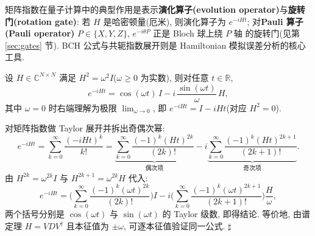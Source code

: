 \documentclass[utf8]{article} %
\numberwithin{equation}{section}   %
\newtheorem{Lem}{\hskip 2em {\color{magenta} 引理}}[subsection]
\newtheorem{Note}{\hskip 2em {\color{red} 注}}[subsection]
\newenvironment{Proof}{{\noindent\it Proof:}\quad}{\hfill $\sharp $\par}
\begin{document}
\begin{Note}
    矩阵指数在量子计算中的典型作用是表示\textbf{演化算子(evolution operator)}与\textbf{旋转门(rotation gate)}: 若 $H$ 是哈密顿量(厄米),
    则演化算子为 $e^{-iHt}$; 对\textbf{Pauli 算子(Pauli operator)} $P \in \{X, Y, Z\}$, $e^{-i\theta P}$ 正是 Bloch 球上绕 $P$ 轴
    的旋转门(见第 \ref{sec:gates} 节). BCH 公式与共轭指数展开则是 Hamiltonian 模拟误差分析的核心工具.
\end{Note}

\begin{Lem}[二次幂矩阵的指数闭式]
    设 $H \in \mathbb{C}^{N\times N}$ 满足 $H^2 = \omega^2 I$($\omega \ge 0$ 为实数), 则对任意 $t \in \mathbb{R}$,
    \begin{equation}
        e^{-iHt} = \cos(\omega t)\, I - i\,\frac{\sin(\omega t)}{\omega}\, H,
    \end{equation}
    其中 $\omega = 0$ 时右端理解为极限 $\lim_{\omega\to 0}$, 即 $e^{-iHt} = I - iHt$(对应 $H^2 = 0$).
\end{Lem}

\begin{Proof}
    对矩阵指数做 Taylor 展开并拆出奇偶次幂:
    \begin{equation*}
        e^{-iHt} = \sum_{k=0}^{\infty} \frac{(-iHt)^k}{k!}
        = \underbrace{\sum_{k=0}^{\infty} \frac{(-1)^k (Ht)^{2k}}{(2k)!}}_{\text{偶次项}}
        - i \underbrace{\sum_{k=0}^{\infty} \frac{(-1)^k (Ht)^{2k+1}}{(2k+1)!}}_{\text{奇次项}}.
    \end{equation*}
    由 $H^{2k} = \omega^{2k} I$ 与 $H^{2k+1} = \omega^{2k} H$ 代入:
    \begin{equation*}
        e^{-iHt} = \Big(\sum_{k=0}^{\infty} \frac{(-1)^k (\omega t)^{2k}}{(2k)!}\Big) I
        - i \Big(\sum_{k=0}^{\infty} \frac{(-1)^k (\omega t)^{2k+1}}{(2k+1)!}\Big) \frac{H}{\omega},
    \end{equation*}
    两个括号分别是 $\cos(\omega t)$ 与 $\sin(\omega t)$ 的 Taylor 级数, 即得结论.
    等价地, 由谱定理 $H = V D V^\dagger$ 且本征值为 $\pm\omega$, 可逐本征值验证同一公式.
\end{Proof}
\end{document}
